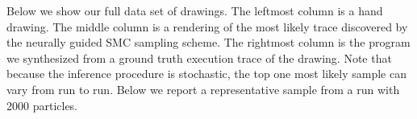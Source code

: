 \documentclass{article}
\begin{document}
Below we show our full data set of drawings. The leftmost column is a hand drawing. The middle column is a rendering of the most likely trace discovered by the neurally guided SMC sampling scheme. The rightmost column is the program we synthesized from a ground truth execution trace of the drawing.
Note that because the inference procedure is stochastic,
the top one most likely sample can vary from run to run.
Below we report a representative sample from a run with 2000 particles.


 



{\small }
 
\end{document}
